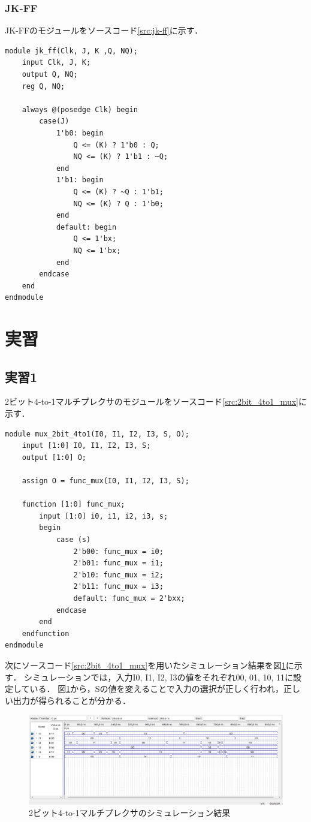 \documentclass{jlreq}
\numberwithin{equation}{section}
\begin{document}
\subsubsection{JK-FF}
JK-FFのモジュールをソースコード\ref{src:jk-ff}に示す．
\begin{lstlisting}[caption=JK-FFのモジュール, label=src:jk-ff]
module jk_ff(Clk, J, K ,Q, NQ);
	input Clk, J, K;
	output Q, NQ;
	reg Q, NQ;
	
	always @(posedge Clk) begin
		case(J)
			1'b0: begin
				Q <= (K) ? 1'b0 : Q;
				NQ <= (K) ? 1'b1 : ~Q;
			end
			1'b1: begin
				Q <= (K) ? ~Q : 1'b1;
				NQ <= (K) ? Q : 1'b0;
			end
			default: begin
				Q <= 1'bx;
				NQ <= 1'bx;
			end
		endcase
	end
endmodule

\end{lstlisting}


\section{実習}
\subsection{実習1}
2ビット4-to-1マルチプレクサのモジュールをソースコード\ref{src:2bit_4to1_mux}に示す．
\begin{lstlisting}[caption=2ビット4-to-1マルチプレクサのモジュール, label=src:2bit_4to1_mux]
module mux_2bit_4to1(I0, I1, I2, I3, S, O);
	input [1:0] I0, I1, I2, I3, S;
	output [1:0] O;
	
	assign O = func_mux(I0, I1, I2, I3, S);
	
	function [1:0] func_mux;
		input [1:0] i0, i1, i2, i3, s;
		begin
			case (s)
				2'b00: func_mux = i0;
				2'b01: func_mux = i1;
				2'b10: func_mux = i2;
				2'b11: func_mux = i3;
				default: func_mux = 2'bxx;
			endcase
		end
	endfunction
endmodule 
\end{lstlisting}

次にソースコード\ref{src:2bit_4to1_mux}を用いたシミュレーション結果を図\ref{fig:result_mux_2bit_4to1}に示す．
シミュレーションでは，入力I0, I1, I2, I3の値をそれぞれ00, 01, 10, 11に設定している．
図\ref{fig:result_mux_2bit_4to1}から，Sの値を変えることで入力の選択が正しく行われ，正しい出力が得られることが分かる．
\begin{figure}[H]
	\centering
	\includegraphics[width=\textwidth]{assets/mux_2bit_4to1_result_input_dif.png}
	\caption{2ビット4-to-1マルチプレクサのシミュレーション結果}
	\label{fig:result_mux_2bit_4to1}
\end{figure}
\end{document}
